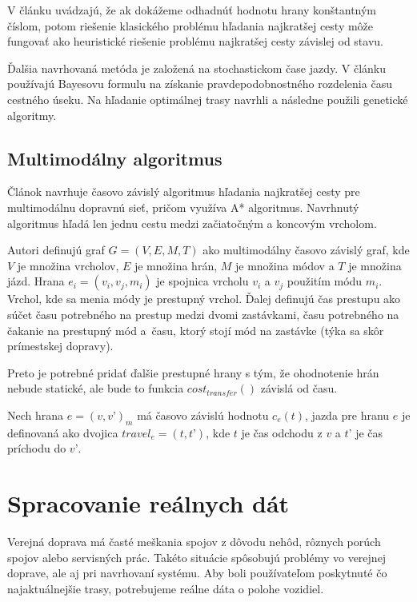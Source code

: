 V článku \cite{trains} uvádzajú, že ak dokážeme odhadnúť hodnotu hrany konštantným číslom, potom riešenie klasického problému hľadania najkratšej cesty môže fungovať ako heuristické riešenie problému najkratšej cesty závislej od stavu.

Ďalšia navrhovaná metóda je založená na stochastickom čase jazdy. V článku \cite{stochastic} používajú Bayesovu formulu na získanie pravdepodobnostného rozdelenia času cestného úseku. Na hľadanie optimálnej trasy navrhli a následne použili genetické algoritmy.

\subsection{Multimodálny algoritmus}
\label{sec:multimodal-algorithm}
Článok \cite{timedependent} navrhuje časovo závislý algoritmus hľadania najkratšej cesty pre multimodálnu dopravnú sieť, pričom využíva A* algoritmus. Navrhnutý algoritmus hľadá len jednu cestu medzi začiatočným a koncovým vrcholom. 

Autori definujú graf $G = (V, E, M, T)$ ako multimodálny časovo závislý graf, kde $V$ je množina vrcholov, $E$ je množina hrán, $M$ je množina módov a $T$ je množina jázd.
Hrana $e_i = (v_i, v_j, m_i)$ je spojnica vrcholu $v_i$ a $v_j$ použitím módu $m_i$. Vrchol, kde sa menia módy je prestupný vrchol. Ďalej definujú čas prestupu ako súčet času potrebného na prestup medzi dvomi zastávkami, času potrebného na čakanie na prestupný mód a~času, ktorý stojí mód na zastávke (týka sa skôr prímestskej dopravy).

Preto je potrebné pridať ďalšie prestupné hrany s tým, že ohodnotenie hrán nebude statické, ale bude to funkcia $cost_{transfer}()$ závislá od času.

Nech hrana $e = (v, v’)_m$ má časovo závislú hodnotu $c_e(t)$, jazda pre hranu $e$ je definovaná ako dvojica $travel_e = (t, t’)$, kde $t$ je čas odchodu z $v$ a $t’$ je čas príchodu do $v’$.

\section{Spracovanie reálnych dát}
\label{sec:models}
Verejná doprava má časté meškania spojov z dôvodu nehôd, rôznych porúch spojov alebo servisných prác. Takéto situácie spôsobujú problémy vo verejnej doprave, ale aj pri navrhovaní systému. Aby boli používateľom poskytnuté čo najaktuálnejšie trasy, potrebujeme reálne dáta o polohe vozidiel.


